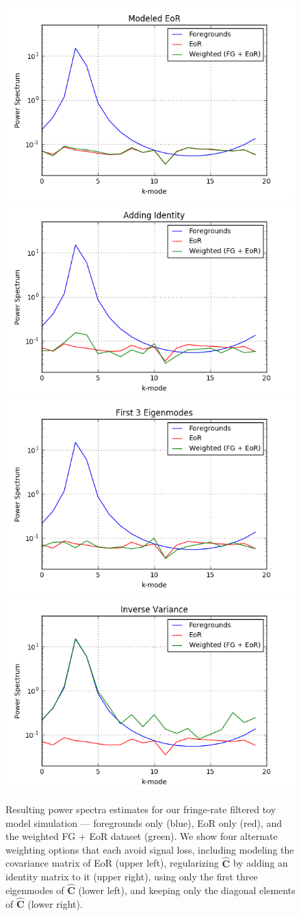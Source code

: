 \documentclass[preprint2,numberedappendix,tighten]{aastex6}  %
\begin{document}
\begin{figure}
	\centering
	\includegraphics[trim={0.4cm 0cm 1.3cm 0cm},clip,height=0.3\textwidth]{plots/toy_sigloss10.png}
	\includegraphics[trim={1cm 0cm 1.3cm 0cm},clip,height=0.3\textwidth]{plots/toy_sigloss8.png}
	\includegraphics[trim={0.4cm 0cm 1.3cm 0cm},clip,height=0.3\textwidth]{plots/toy_sigloss9.png}
	\includegraphics[trim={1cm 0cm 1.3cm 0cm},clip,height=0.3\textwidth]{plots/toy_sigloss11.png}
	\caption{Resulting power spectra estimates for our fringe-rate filtered toy model simulation --- foregrounds only (blue), EoR only (red), and the weighted FG + EoR dataset (green). We show four alternate weighting options that each avoid signal loss, including modeling the covariance matrix of EoR (upper left), regularizing $\hat{\textbf{C}}$ by adding an identity matrix to it (upper right), using only the first three eigenmodes of $\hat{\textbf{C}}$ (lower left), and keeping only the diagonal elements of $\hat{\textbf{C}}$ (lower right).}
	\label{fig:toy_sigloss8}
\end{figure}
\end{document}
